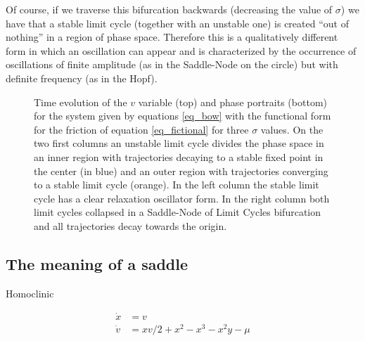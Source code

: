 \documentclass{article}
\begin{document}
Of course, if we traverse this bifurcation backwards (decreasing the value of $\sigma$) we have that a stable limit cycle (together with an unstable one) is created “out of nothing” in a region of phase space. 
Therefore this is a qualitatively different form in which an oscillation can appear and is characterized by the occurrence of oscillations of finite amplitude (as in the Saddle-Node on the circle) but with definite frequency (as in the Hopf).




\begin{figure}[h]
    \centering
    \caption{Time evolution of the $v$ variable (top) and phase portraits (bottom) for the system given by equations \ref{eq_bow} with the functional form for the friction of equation \ref{eq_fictional} for three $\sigma$ values. On the two first columns an unstable limit cycle divides the phase space in an inner region with trajectories decaying to a stable fixed point in the center (in blue) and an outer region with trajectories converging to a stable limit cycle (orange). In the left column the stable limit cycle has a clear relaxation oscillator form. In the right column both limit cycles collapsed in a Saddle-Node of Limit Cycles bifurcation and all trajectories decay towards the origin.} 
    \label{fig_friction2}
    
\end{figure}

\subsection{The meaning of a saddle}

Homoclinic

\begin{subequations} \label{eq_homoclinic}
\begin{align}
    \dot{x} & = v \\
    \dot{v} & = xv/2 + x^2 - x^3 -x^2y - \mu
\end{align}
\end{subequations}
\end{document}

